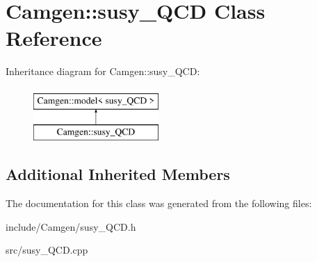 \hypertarget{a00515}{\section{Camgen\-:\-:susy\-\_\-\-Q\-C\-D Class Reference}
\label{a00515}
}
Inheritance diagram for Camgen\-:\-:susy\-\_\-\-Q\-C\-D\-:\begin{figure}[H]
\begin{center}
\leavevmode
\includegraphics[height=2.000000cm]{a00515}
\end{center}
\end{figure}
\subsection*{Additional Inherited Members}


The documentation for this class was generated from the following files\-:\begin{DoxyCompactItemize}
\item 
include/\-Camgen/susy\-\_\-\-Q\-C\-D.\-h\item 
src/susy\-\_\-\-Q\-C\-D.\-cpp\end{DoxyCompactItemize}
